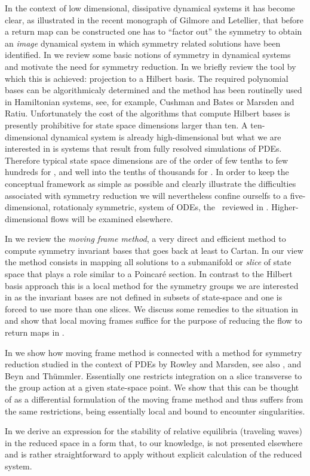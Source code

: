 In the context of low dimensional, dissipative dynamical systems it has become clear, as illustrated
in the recent monograph of Gilmore and Letellier, that before a return
map can be constructed one has to ``factor out'' the symmetry to obtain an \emph{image}
dynamical system in which symmetry related solutions have been identified. In  we
review some basic notions of symmetry in dynamical systems and motivate the need for symmetry 
reduction. In  we briefly review the tool by which this is achieved: projection 
to a Hilbert basis. The required polynomial bases can be algorithmicaly determined
and the method has been routinelly used in Hamiltonian systems, see, for example, 
Cushman and Bates or Marsden and Ratiu. 
Unfortunately the cost of the algorithms that compute Hilbert bases is presently prohibitive 
for state space dimensions larger than ten. A ten-dimensional dynamical system is already high-dimensional
but what we are interested in is systems that result from fully resolved simulations of PDEs.
Therefore typical state space dimensions are of the order of few tenths to few hundreds for \KSe, and
well into the tenths of thousands for \PCf. In order to keep the conceptual framework as simple as possible
and clearly illustrate the difficulties associated with symmetry reduction 
we will nevertheless confine ourselfs to a five-dimensional, rotationaly symmetric, 
system of ODEs, the \CLe\ reviewed in . Higher-dimensional flows will
be examined elsewhere.

In  we review the \emph{moving frame method}, a very direct and efficient method to compute 
symmetry invariant bases that goes back at least to Cartan. In our view the method consists in mapping all solutions
to a submanifold or \emph{slice} of state space that plays a role similar to a Poincar\'e section. In contrast to the Hilbert basis approach this 
is a local method for the symmetry groups we are interested in as the invariant bases are not defined in subsets 
of state-space and one is forced to use more than one slices. We discuss some remedies to the situation 
in  and show that local moving frames 
suffice for the purpose of reducing the flow to return maps in .

In  we show how moving frame method is connected with a method for symmetry reduction studied in
the context of PDEs by Rowley and Marsden, see also , 
and Beyn and Th\"ummler. Essentially one restricts integration on a slice transverse to 
the group action at a given state-space point. We show that this can be thought of as a differential formulation 
of the moving frame method and thus suffers from the same restrictions, being essentially local 
and bound to encounter singularities.  

In  we derive an expression for the stability of relative equilibria (traveling waves) in the reduced space
in a form that, to our knowledge, is not presented elsewhere and is rather straightforward to apply without explicit calculation of
the reduced system. 






